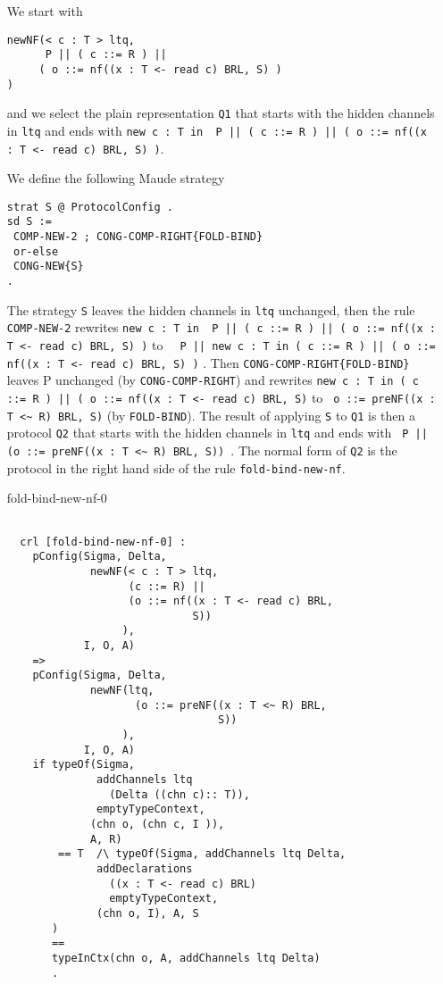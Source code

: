 \documentclass{article}
\begin{document}
\begin{itemize}
We start with 
 \begin{lstlisting}  
newNF(< c : T > ltq, 
      P || ( c ::= R ) || 
     ( o ::= nf((x : T <- read c) BRL, S) )
)    
 \end{lstlisting}
\noindent and we select the plain representation \verb+Q1+ that starts with the
hidden channels in \verb+ltq+ and ends with 
\verb+new c : T in  P || ( c ::= R ) || ( o ::= nf((x : T <- read c) BRL, S) )+.

We define the following Maude strategy
\begin{lstlisting}
strat S @ ProtocolConfig . 
sd S := 
 COMP-NEW-2 ; CONG-COMP-RIGHT{FOLD-BIND}
 or-else
 CONG-NEW{S}
.
\end{lstlisting}
The strategy \verb+S+ leaves the hidden channels in \verb+ltq+ unchanged,
then the rule \verb+COMP-NEW-2+ rewrites
\verb+new c : T in  P || ( c ::= R ) || ( o ::= nf((x : T <- read c) BRL, S) )+
to
\verb+  P || new c : T in ( c ::= R ) || ( o ::= nf((x : T <- read c) BRL, S) )+ 
. Then \verb+CONG-COMP-RIGHT{FOLD-BIND}+ leaves P unchanged (by \verb+CONG-COMP-RIGHT+) and rewrites
\verb+new c : T in ( c ::= R ) || ( o ::= nf((x : T <- read c) BRL, S)+
to
\verb+ o ::= preNF((x : T <~ R) BRL, S)+ (by \verb+FOLD-BIND+).
The result of applying \verb+S+ to \verb+Q1+ is then a protocol \verb+Q2+ that 
starts with the hidden channels in \verb+ltq+ and ends with
\verb+ P || (o ::= preNF((x : T <~ R) BRL, S)) +. The normal form of 
\verb+Q2+ is the protocol in the right hand side of the rule \verb+fold-bind-new-nf+.

 
\item[fold-bind-new-nf-0]
 \begin{lstlisting}  
  
  crl [fold-bind-new-nf-0] :
    pConfig(Sigma, Delta, 
             newNF(< c : T > ltq, 
                   (c ::= R) || 
                   (o ::= nf((x : T <- read c) BRL, 
                             S))
                  ),
            I, O, A)
    => 
    pConfig(Sigma, Delta, 
             newNF(ltq, 
                    (o ::= preNF((x : T <~ R) BRL, 
                                 S))
                  ),
            I, O, A) 
    if typeOf(Sigma, 
              addChannels ltq 
                (Delta ((chn c):: T)), 
              emptyTypeContext, 
             (chn o, (chn c, I )), 
             A, R) 
        == T  /\ typeOf(Sigma, addChannels ltq Delta, 
              addDeclarations 
                ((x : T <- read c) BRL) 
                emptyTypeContext,
              (chn o, I), A, S
       ) 
       == 
       typeInCtx(chn o, A, addChannels ltq Delta) 
       .
       

\end{lstlisting}
\end{itemize}
\end{document}

